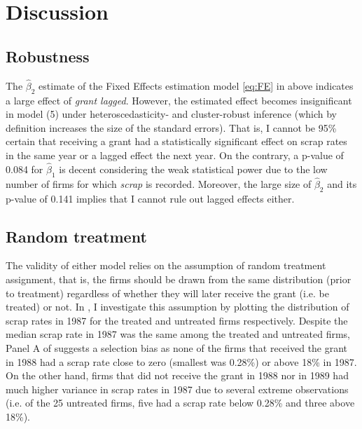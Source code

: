 \section{Discussion}
\label{s:discussion}

\subsection{Robustness}
\label{s:discussion_robustness}
The $\hat{\beta}_2$ estimate of the Fixed Effects estimation model \eqref{eq:FE} in  above \citep[identical to table 14.1 in][p. 464]{wooldridge2019introductory} indicates a large effect of \emph{grant lagged}. However, the estimated effect becomes insignificant in model (5) under heteroscedasticity- and cluster-robust inference (which by definition increases the size of the standard errors). That is, I cannot be 95\% certain that receiving a grant had a statistically significant effect on scrap rates in the same year or a lagged effect the next year. On the contrary, a p-value of 0.084 for $\hat{\beta}_1$ is decent considering the weak statistical power due to the low number of firms for which \emph{scrap} is recorded. Moreover, the large size of $\hat{\beta}_2$ and its p-value of 0.141 implies that I cannot rule out lagged effects either.

\subsection{Random treatment}
\label{s:discussion_random}
The validity of either model relies on the assumption of random treatment assignment, that is, the firms should be drawn from the same distribution (prior to treatment) regardless of whether they will later receive the grant (i.e. be treated) or not. In , I investigate this assumption by plotting the distribution of scrap rates in 1987 for the treated and untreated firms respectively. Despite the median scrap rate in 1987 was the same among the treated and untreated firms, Panel A of  suggests a selection bias as none of the firms that received the grant in 1988 had a scrap rate close to zero (smallest was 0.28\%) or above 18\% in 1987. On the other hand, firms that did not receive the grant in 1988 nor in 1989 had much higher variance in scrap rates in 1987 due to several extreme observations (i.e. of the 25 untreated firms, five had a scrap rate below 0.28\% and three above 18\%).